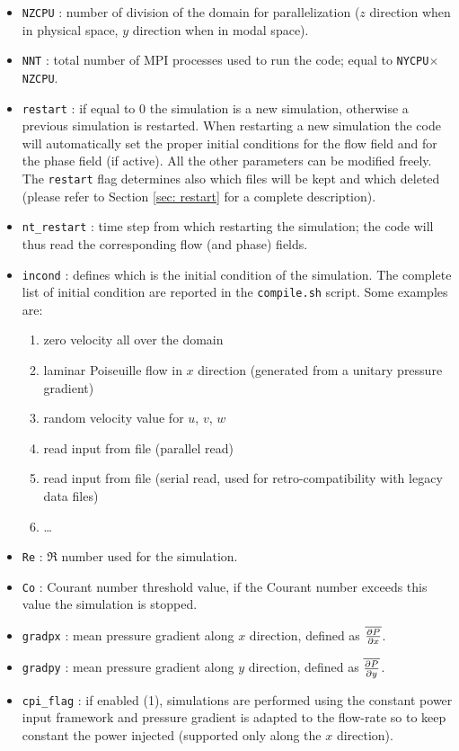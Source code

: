 \begin{itemize}
\item \texttt{NZCPU} : number of division of the domain for parallelization ($z$ direction when in physical space, $y$ direction when in modal space).
\item \texttt{NNT} : total number of MPI processes used to run the code; equal to \texttt{NYCPU}$\times$\texttt{NZCPU}.
\item \texttt{restart} : if equal to 0 the simulation is a new simulation, otherwise a previous simulation is restarted. When restarting a new simulation the code will automatically set the proper initial conditions for the flow field and for the phase field (if active). All the other parameters can be modified freely. The \texttt{restart} flag determines also which files will be kept and which deleted (please refer to Section \ref{sec: restart} for a complete description).
\item \texttt{nt\_restart} : time step from which restarting the simulation; the code will thus read the corresponding flow (and phase) fields.
\item \texttt{incond} : defines which is the initial condition of the simulation. The complete list of initial condition are reported in the \texttt{compile.sh} script. Some examples are:
\begin{enumerate}
\item zero velocity all over the domain
\item laminar Poiseuille flow in $x$ direction (generated from a unitary pressure gradient)
\item random velocity value for $u$, $v$, $w$
\item read input from file (parallel read)
\item read input from file (serial read, used for retro-compatibility with legacy data files)
\item \dots
\end{enumerate}
\item \texttt{Re} : $\Re$ number used for the simulation.
\item \texttt{Co} : Courant number threshold value, if the Courant number exceeds this value the simulation is stopped.
\item \texttt{gradpx} : mean pressure gradient along $x$ direction, defined as $\overline{\frac{\partial P}{\partial x}}$.
\item \texttt{gradpy} : mean pressure gradient along $y$ direction, defined as $\overline{\frac{\partial P}{\partial y}}$.
\item \texttt{cpi\_flag} : if enabled (1), simulations are performed using the constant power input framework and pressure gradient is adapted to the flow-rate so to keep constant the power injected (supported only along the $x$ direction).

\end{itemize}
